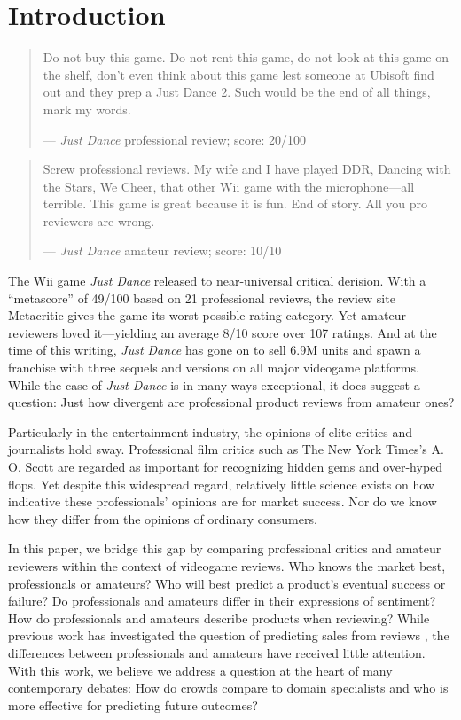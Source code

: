 \documentclass[letterpaper]{article}
\begin{document}
\section{Introduction}
\vspace{6pt}
\begin{quote}
\small
Do not buy this game. Do not rent this game, do not look at this game on the shelf, don't even think about this game lest someone at Ubisoft find out and they prep a Just Dance 2. Such would be the end of all things, mark my words.

--- \textit{Just Dance} professional review; score: 20/100 %
\end{quote}

\begin{quote}
\small
Screw professional reviews. My wife and I have played DDR, Dancing with
the Stars, We Cheer, that other Wii game with the microphone---all terrible. This game is great because it is fun. End of story. All you pro reviewers are wrong.

--- \textit{Just Dance} amateur review; score: 10/10
\end{quote}

The Wii game \textit{Just Dance} released to near-universal
critical derision. With a ``metascore'' of 49/100 based on 21
professional reviews, the review site Metacritic gives the game its worst
possible rating category. Yet amateur reviewers loved it---yielding an average 8/10 score over 107 ratings. And at the
time of this writing, \textit{Just Dance} has gone on to sell 6.9M units
and spawn a franchise with three sequels and versions on all major
videogame platforms. While the case of \textit{Just Dance} is in many
ways exceptional, it does suggest a question: Just how divergent are professional product reviews from amateur ones?

Particularly in the entertainment industry, the opinions of elite
critics and journalists hold sway. Professional film critics
such as The New York Times's A. O. Scott are regarded as important
for recognizing hidden gems and over-hyped flops. Yet despite this
widespread regard, relatively little science exists on how indicative
these professionals' opinions are for market success. Nor do we know 
how they differ from the opinions of ordinary consumers.

In this paper, we bridge this gap by comparing professional critics and
amateur reviewers within the context of videogame reviews. Who knows the
market best, professionals or amateurs? Who will best predict a
product's eventual success or failure? Do professionals and amateurs
differ in their expressions of sentiment? How do professionals and
amateurs describe products when reviewing? While previous work has
investigated the question of predicting sales from reviews
\cite{chevalier2003effect,dellarocas2007exploring,duan2008online,forman2008examining,gruhl2005predictive,liu2001word,yu2012mining},
the differences between professionals and amateurs have received little
attention. With this work, we believe we address a question at the heart
of many contemporary debates: How do crowds compare to domain
specialists and who is more effective for predicting future outcomes?
\end{document}
